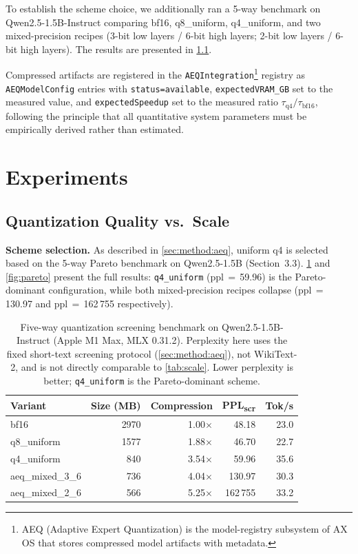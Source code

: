 \documentclass[10pt,twocolumn]{article}
\begin{document}
To establish the scheme choice, we additionally ran a 5-way benchmark on
Qwen2.5-1.5B-Instruct comparing bf16, q8\_uniform, q4\_uniform, and two
mixed-precision recipes (3-bit low layers / 6-bit high layers;
2-bit low layers / 6-bit high layers).  The results are presented in
\cref{sec:exp:aeq}.

Compressed artifacts are registered in the \texttt{AEQIntegration}\footnote{AEQ (Adaptive Expert Quantization) is the model-registry subsystem of AX OS that stores compressed model artifacts with metadata.} registry
as \texttt{AEQModelConfig} entries with \texttt{status=available},
\texttt{expectedVRAM\_GB} set to the measured value, and
\texttt{expectedSpeedup} set to the measured ratio $\tau_\text{q4} /
\tau_\text{bf16}$, following the principle that all quantitative system parameters
must be empirically derived rather than estimated.

\section{Experiments}
\label{sec:experiments}

\subsection{Quantization Quality vs.\ Scale}
\label{sec:exp:aeq}

\textbf{Scheme selection.}  As described in \cref{sec:method:aeq}, uniform q4
is selected based on the 5-way Pareto benchmark on Qwen2.5-1.5B (Section~3.3).
\cref{tab:qwen_5way} and \cref{fig:pareto} present the full results:
\texttt{q4\_uniform} (ppl\,$=$\,59.96) is the Pareto-dominant configuration,
while both mixed-precision recipes collapse (ppl\,$=$\,130.97 and
ppl\,$=$\,162\,755 respectively).

\begin{table}[t]
  \centering
  \caption{Five-way quantization screening benchmark on Qwen2.5-1.5B-Instruct
    (Apple M1 Max, MLX 0.31.2).  Perplexity here uses the fixed short-text
    screening protocol (\cref{sec:method:aeq}), not WikiText-2, and is not
    directly comparable to \cref{tab:scale}.  Lower perplexity is better;
    \texttt{q4\_uniform} is the Pareto-dominant scheme.}
  \label{tab:qwen_5way}
  \begin{tabular}{lrrrr}
    \toprule
    Variant & Size (MB) & Compression & PPL\textsubscript{scr} & Tok/s \\
    \midrule
    bf16            & 2970 & 1.00$\times$ &  48.18 &  23.0 \\
    q8\_uniform     & 1577 & 1.88$\times$ &  46.70 &  22.7 \\
    q4\_uniform     &  840 & 3.54$\times$ &  59.96 &  35.6 \\
    aeq\_mixed\_3\_6 &  736 & 4.04$\times$ & 130.97 &  30.3 \\
    aeq\_mixed\_2\_6 &  566 & 5.25$\times$ & 162\,755 & 33.2 \\
    \bottomrule
  \end{tabular}
\end{table}
\end{document}
